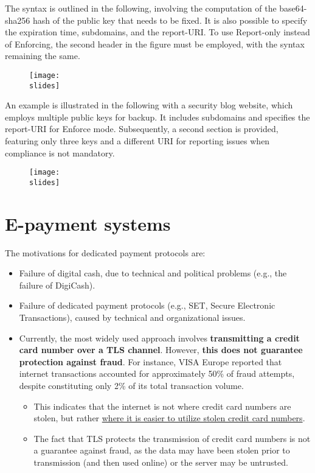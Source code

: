The syntax is outlined in the following, involving the computation of the base64-sha256 hash of the public key that needs to be fixed. It is also possible to specify the expiration time, subdomains, and the report-URI. To use Report-only instead of Enforcing, the second header in the figure must be employed, with the syntax remaining the same.
\begin{figure}[H]
    \centering
    \texttt{[image: \\slides]}
\end{figure}


An example is illustrated in the following with a security blog website, which employs multiple public keys for backup. It includes subdomains and specifies the report-URI for Enforce mode. Subsequently, a second section is provided, featuring only three keys and a different URI for reporting issues when compliance is not mandatory.
\begin{figure}[H]
    \centering
    \texttt{[image: \\slides]}
\end{figure}

\section{E-payment systems}

The motivations for dedicated payment protocols are:

\begin{itemize}
    \item Failure of digital cash, due to technical and political problems (e.g., the failure of DigiCash).
    \item Failure of dedicated payment protocols (e.g., SET, Secure Electronic Transactions), caused by technical and organizational issues.
    \item Currently, the most widely used approach involves \textbf{transmitting a credit card number over a TLS channel}. However, \textbf{this does not guarantee protection against fraud}. For instance, VISA Europe reported that internet transactions accounted for approximately 50\% of fraud attempts, despite constituting only 2\% of its total transaction volume.
        \begin{itemize}
            \item This indicates that the internet is not where credit card numbers are stolen, but rather \ul{where it is easier to utilize stolen credit card numbers}.
            \item The fact that TLS protects the transmission of credit card numbers is not a guarantee against fraud, as the data may have been stolen prior to transmission (and then used online) or the server may be untrusted.
        \end{itemize}
\end{itemize}



